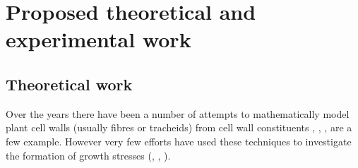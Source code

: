 \section{Proposed theoretical and experimental work}
\subsection{Theoretical work}
Over the years there have been a number of attempts to mathematically model plant
cell walls (usually fibres or tracheids) from cell wall constituents \cite{mark1967cell}, \cite{Astley_1998}, \cite{Yamamoto_2002}, \cite{Kojima_2004} are a few example. However very few efforts have used these
techniques to investigate the formation of growth stresses (\cite{Archer_1987},
\cite{Yamamoto_1998}, \cite{Guitard_1999}).